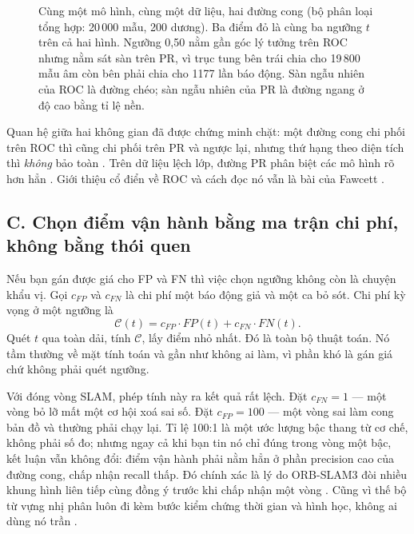\documentclass[../../deep_learning.tex]{subfiles}
\begin{document}
\begin{figure}[H]
{}
\caption{Cùng một mô hình, cùng một dữ liệu, hai đường cong (bộ phân loại tổng hợp: 20\,000 mẫu, 200 dương). Ba điểm đỏ là cùng ba ngưỡng \(t\) trên cả hai hình. Ngưỡng 0{,}50 nằm gần góc lý tưởng trên ROC nhưng nằm sát sàn trên PR, vì trục tung bên trái chia cho 19\,800 mẫu âm còn bên phải chia cho 1177 lần báo động. Sàn ngẫu nhiên của ROC là đường chéo; sàn ngẫu nhiên của PR là đường ngang ở độ cao bằng tỉ lệ nền.}
\label{fig:b07-prroc}
\end{figure}

Quan hệ giữa hai không gian đã được chứng minh chặt: một đường cong chi phối trên ROC thì cũng chi phối trên PR và ngược lại, nhưng thứ hạng theo diện tích thì \emph{không} bảo toàn \cite{davis2006prroc}. Trên dữ liệu lệch lớp, đường PR phân biệt các mô hình rõ hơn hẳn \cite{saito2015prplot}. Giới thiệu cổ điển về ROC và cách đọc nó vẫn là bài của Fawcett \cite{fawcett2006roc}.

\subsection{C. Chọn điểm vận hành bằng ma trận chi phí, không bằng thói quen}
Nếu bạn gán được giá cho FP và FN thì việc chọn ngưỡng không còn là chuyện khẩu vị. Gọi \(c_{FP}\) và \(c_{FN}\) là chi phí một báo động giả và một ca bỏ sót. Chi phí kỳ vọng ở một ngưỡng là
\[
\mathcal{C}(t) = c_{FP}\cdot FP(t) + c_{FN}\cdot FN(t).
\]
Quét \(t\) qua toàn dải, tính \(\mathcal{C}\), lấy điểm nhỏ nhất. Đó là toàn bộ thuật toán. Nó tầm thường về mặt tính toán và gần như không ai làm, vì phần khó là gán giá chứ không phải quét ngưỡng.

Với đóng vòng SLAM, phép tính này ra kết quả rất lệch. Đặt \(c_{FN} = 1\) --- một vòng bỏ lỡ mất một cơ hội xoá sai số. Đặt \(c_{FP} = 100\) --- một vòng sai làm cong bản đồ và thường phải chạy lại. Tỉ lệ 100:1 là một ước lượng bậc thang từ cơ chế, không phải số đo; nhưng ngay cả khi bạn tin nó chỉ đúng trong vòng một bậc, kết luận vẫn không đổi: điểm vận hành phải nằm hẳn ở phần precision cao của đường cong, chấp nhận recall thấp. Đó chính xác là lý do ORB-SLAM3 đòi nhiều khung hình liên tiếp cùng đồng ý trước khi chấp nhận một vòng \cite{campos2021orbslam3}. Cũng vì thế bộ từ vựng nhị phân luôn đi kèm bước kiểm chứng thời gian và hình học, không ai dùng nó trần \cite{galvez2012dbow}.
\end{document}

